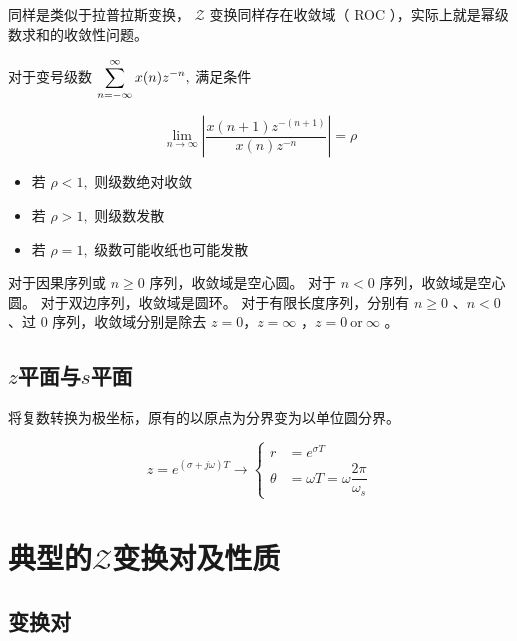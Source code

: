 \documentclass[cn,11pt,chinese,black,simple]{../elegantbook}
\begin{document}
同样是类似于拉普拉斯变换， \(\mathscr{Z}\) 变换同样存在收敛域（ ROC ），实际上就是幂级数求和的收敛性问题。

对于变号级数 \(\displaystyle\sum_{n=-\infty}^{\infty} x(n) z^{-n},\) 满足条件

\[
\lim _{n \rightarrow \infty}\left|\dfrac{x(n+1) z^{-(n+1)}}{x(n) z^{-n}}\right|=\rho
\]

\begin{itemize}
    \item 若 \(\rho < 1 ,\) 则级数绝对收敛
    \item 若 \(\rho>1,\) 则级数发散
    \item 若 \(\rho=1,\) 级数可能收纸也可能发散
\end{itemize}

对于因果序列或 \(n \geq 0\) 序列，收敛域是空心圆。
对于 \(n < 0\) 序列，收敛域是空心圆。
对于双边序列，收敛域是圆环。
对于有限长度序列，分别有 \(n \geq 0\) 、\(n < 0\) 、过 \(0\) 序列，收敛域分别是除去 \(z = 0\)，\(z = \infty\) ，\(z = 0\  \text{or} \ \infty\) 。

\subsection{\(z\)平面与\(s\)平面} 

将复数转换为极坐标，原有的以原点为分界变为以单位圆分界。

\[z = e^{(\sigma + j \omega )T} \rightarrow \left\{
\begin{aligned}
    r &= e^{\sigma T} \\
    \theta &= \omega T = \omega \dfrac{2 \pi}{\omega_s}
\end{aligned}\right.
\]

\section{典型的\(\mathscr{Z}\)变换对及性质}


\subsection{变换对}
\end{document}
